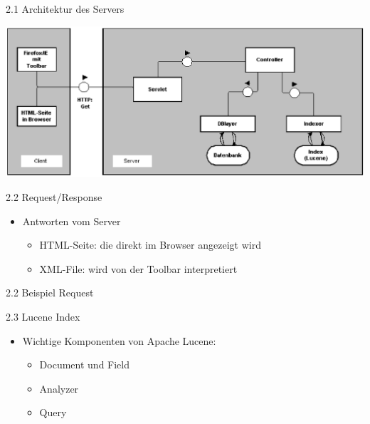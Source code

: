 \documentclass[landscape]{slides}
\begin{document}
%
%
%
\begin{slide}{2.1 Architektur des Servers}\\
\begin{center}
\includegraphics{bilder/aufbau2.eps}
\end{center}
\end{slide}
%
\begin{slide}{2.2 Request/Response }\\
\begin{itemize}
\item Antworten vom Server
\begin{itemize}
\item HTML-Seite: die direkt im Browser angezeigt wird
\item XML-File: wird von der Toolbar interpretiert
\end{itemize}	
\end{itemize}
\end{slide}
%
\begin{slide}{2.2 Beispiel Request}\\
\end{slide}
%
\begin{slide}{2.3 Lucene Index}\\
\begin{itemize}
\item Wichtige Komponenten von Apache Lucene:
\begin{itemize}
\item Document und Field
\item Analyzer
\item Query
\end{itemize}
\end{itemize}
\end{slide}
\end{document}
